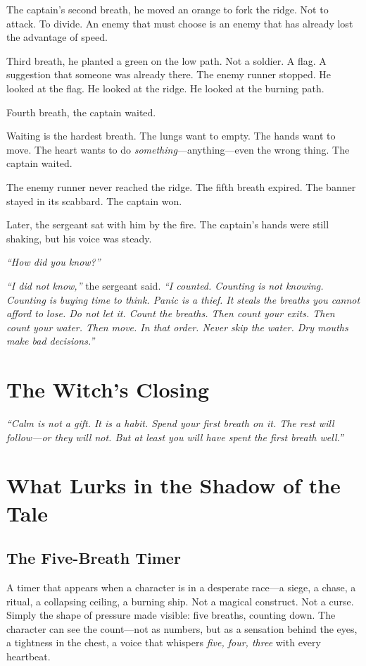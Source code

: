 The captain's second breath, he moved an orange to fork the ridge. Not to attack. To divide. An enemy that must choose is an enemy that has already lost the advantage of speed.

Third breath, he planted a green on the low path. Not a soldier. A flag. A suggestion that someone was already there. The enemy runner stopped. He looked at the flag. He looked at the ridge. He looked at the burning path.

Fourth breath, the captain waited.

Waiting is the hardest breath. The lungs want to empty. The hands want to move. The heart wants to do \textit{something}---anything---even the wrong thing. The captain waited.

The enemy runner never reached the ridge. The fifth breath expired. The banner stayed in its scabbard. The captain won.

Later, the sergeant sat with him by the fire. The captain's hands were still shaking, but his voice was steady.

\textit{``How did you know?''}

\textit{``I did not know,''} the sergeant said. \textit{``I counted. Counting is not knowing. Counting is buying time to think. Panic is a thief. It steals the breaths you cannot afford to lose. Do not let it. Count the breaths. Then count your exits. Then count your water. Then move. In that order. Never skip the water. Dry mouths make bad decisions.''}

\section*{The Witch's Closing}
\textit{``Calm is not a gift. It is a habit. Spend your first breath on it. The rest will follow---or they will not. But at least you will have spent the first breath well.''}

\section*{What Lurks in the Shadow of the Tale}

\subsection*{The Five-Breath Timer }

A timer that appears when a character is in a desperate race---a siege, a chase, a ritual, a collapsing ceiling, a burning ship. Not a magical construct. Not a curse. Simply the shape of pressure made visible: five breaths, counting down. The character can see the count---not as numbers, but as a sensation behind the eyes, a tightness in the chest, a voice that whispers \textit{five, four, three} with every heartbeat.

